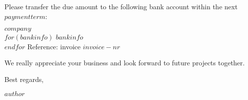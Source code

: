 \documentclass[$fontsize$, a4paper]{article}
\begin{document}
\vspace{10mm}

\sffamily
\small
  Please transfer the due amount to the following bank account within the next $paymentterm$:

$company$\\
$for(bankinfo)$
$bankinfo$\\
$endfor$
Reference: invoice $invoice-nr$

\vspace{10mm}


  We really appreciate your business and look forward to future projects together.

  Best regards,

\medskip

$author$
\end{document}
